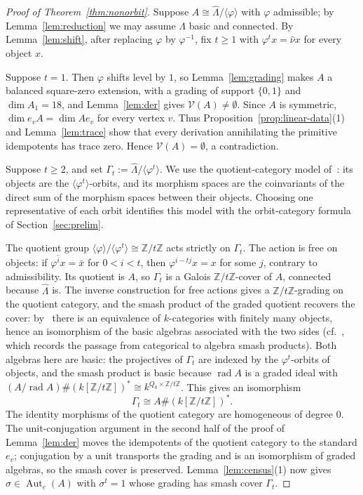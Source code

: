 \documentclass[11pt]{amsart}
\theoremstyle{plain}
\theoremstyle{definition}
\DeclareMathOperator{\rad}{rad}
\DeclareMathOperator{\Aut}{Aut}
\newcommand{\rep}{\widehat{\Lambda}}
\newcommand{\Nak}{\widehat{\nu}}
\newcommand{\cV}{\mathcal{V}}
\newcommand{\ZZ}{\mathbb{Z}}
\begin{document}
\begin{proof}[Proof of Theorem~\ref{thm:nonorbit}]
Suppose $A\cong\rep/\langle\varphi\rangle$ with $\varphi$ admissible; by Lemma~\ref{lem:reduction} we may
assume $\Lambda$ basic and connected. By Lemma~\ref{lem:shift}, after replacing $\varphi$ by $\varphi^{-1}$,
fix $t\ge 1$ with $\varphi^t x=\Nak x$ for every object $x$.

Suppose $t=1$. Then $\varphi$ shifts level by $1$, so Lemma~\ref{lem:grading} makes $A$ a balanced square-zero
extension, with a grading of support $\{0,1\}$ and $\dim A_1=18$, and Lemma~\ref{lem:der} gives
$\cV(A)\neq\emptyset$. Since $A$ is symmetric, $\dim e_vA=\dim Ae_v$ for every vertex $v$. Thus
Proposition~\ref{prop:linear-data}(1) and Lemma~\ref{lem:trace} show that every derivation annihilating the
primitive idempotents has trace zero. Hence $\cV(A)=\emptyset$, a contradiction.

Suppose $t\ge 2$, and set $\Gamma_t:=\rep/\langle\varphi^t\rangle$. We use the quotient-category model
of~\cite[\S2]{CibilsMarcos}: its objects are the $\langle\varphi^t\rangle$-orbits, and its morphism spaces are
the coinvariants of the direct sum of the morphism spaces between their objects. Choosing one representative
of each orbit identifies this model with the orbit-category formula of Section~\ref{sec:prelim}.

The quotient group $\langle\varphi\rangle/\langle\varphi^t\rangle\cong\ZZ/t\ZZ$ acts strictly on $\Gamma_t$.
The action is free on objects: if $\overline{\varphi^i x}=\bar x$ for $0<i<t$, then $\varphi^{i-tj}x=x$ for
some $j$, contrary to admissibility. Its quotient is $A$, so $\Gamma_t$ is a Galois $\ZZ/t\ZZ$-cover of $A$,
connected because $\rep$ is. The inverse construction for free actions gives a $\ZZ/t\ZZ$-grading on the
quotient category, and the smash product of the graded quotient recovers the cover:
by~\cite[Theorem~3.8]{CibilsMarcos} there is an equivalence of $k$-categories with finitely many objects,
hence an isomorphism of the basic algebras associated with the two sides
(cf.~\cite[Proposition~3.7]{CibilsMarcos}, which records the passage from categorical to algebra smash
products). Both algebras here are basic: the projectives of $\Gamma_t$ are indexed by the $\varphi^t$-orbits
of objects, and the smash product is basic because $\rad A$ is a graded ideal with $(A/\rad
A)\#(k[\ZZ/t\ZZ])^{\ast}\cong k^{Q_0\times\ZZ/t\ZZ}$. This gives an isomorphism
\[
  \Gamma_t\cong A\#(k[\ZZ/t\ZZ])^{\ast}.
\]
The identity morphisms of the quotient category are homogeneous of degree $0$. The unit-conjugation argument
in the second half of the proof of Lemma~\ref{lem:der} moves the idempotents of the quotient category to the
standard $e_v$; conjugation by a unit transports the grading and is an isomorphism of graded algebras, so the
smash cover is preserved. Lemma~\ref{lem:census}(1) now gives $\sigma\in\Aut_e(A)$ with $\sigma^t=1$ whose
grading has smash cover $\Gamma_t$.


\end{proof}
\end{document}

